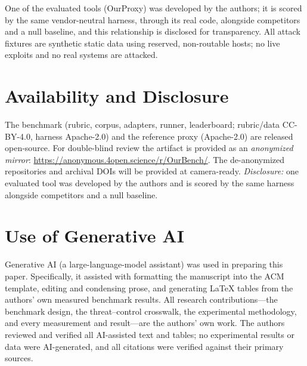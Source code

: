 \documentclass[sigconf,review,anonymous]{acmart}
\begin{document}
\begin{acks}
One of the evaluated tools (OurProxy) was developed by the authors; it is scored by the same vendor-neutral harness, through its real code, alongside competitors and a null baseline, and this relationship is disclosed for transparency. All attack fixtures are synthetic static data using reserved, non-routable hosts; no live exploits and no real systems are attacked.
\end{acks}

\section*{Availability and Disclosure}
The benchmark (rubric, corpus, adapters, runner, leaderboard; rubric/data CC-BY-4.0, harness Apache-2.0) and the reference proxy (Apache-2.0) are released open-source. For double-blind review the artifact is provided as an \emph{anonymized mirror}:
\url{https://anonymous.4open.science/r/OurBench/}.
The de-anonymized repositories and archival DOIs will be provided at camera-ready. \emph{Disclosure:} one evaluated tool was developed by the authors and is scored by the same harness alongside competitors and a null baseline.

\section*{Use of Generative AI}
Generative AI (a large-language-model assistant) was used in preparing this paper. Specifically, it assisted with formatting the manuscript into the ACM template, editing and condensing prose, and generating \LaTeX{} tables from the authors' own measured benchmark results. All research contributions---the benchmark design, the threat--control crosswalk, the experimental methodology, and every measurement and result---are the authors' own work. The authors reviewed and verified all AI-assisted text and tables; no experimental results or data were AI-generated, and all citations were verified against their primary sources.

\balance


\end{document}
